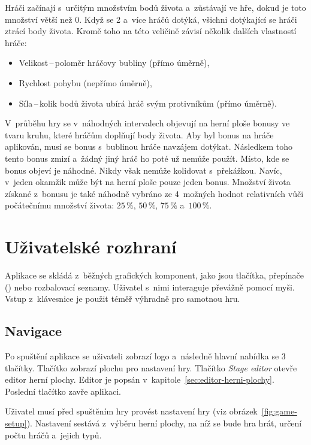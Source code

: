 Hráči začínají s~určitým množstvím bodů života a~zůstávají ve hře, dokud je toto množství větší než 0. Když se 2 a~více hráčů dotýká, všichni dotýkající se hráči ztrácí body života. Kromě toho na této veličině závisí několik dalších vlastností hráče:
\begin{itemize}
    \item Velikost\,--\,poloměr hráčovy bubliny (přímo úměrně),
    \item Rychlost pohybu (nepřímo úměrně),
    \item Síla\,--\,kolik bodů života ubírá hráč svým protivníkům (přímo úměrně).
\end{itemize}

V~průběhu hry se v~náhodných intervalech objevují na herní ploše bonusy ve tvaru kruhu, které hráčům doplňují body života. Aby byl bonus na hráče aplikován, musí se bonus s~bublinou hráče navzájem dotýkat. Následkem toho tento bonus zmizí a~žádný jiný hráč ho poté už nemůže použít. Místo, kde se bonus objeví je náhodné. Nikdy však nemůže kolidovat s~překážkou. Navíc, v~jeden okamžik může být na herní ploše pouze jeden bonus. Množství života získané z~bonusu je také náhodně vybráno ze 4~možných hodnot relativních vůči počátečnímu množství života: $25\,\%$, $50\,\%$, $75\,\%$ a~$100\,\%$.

\section{Uživatelské rozhraní}
\label{sec:uzivatelske-rozhrani}

Aplikace se skládá z~běžných grafických komponent, jako jsou tlačítka, přepínače () nebo rozbalovací seznamy. Uživatel s~nimi interaguje převážně pomocí myši. Vstup z~klávesnice je použit téměř výhradně pro samotnou hru.

\subsection*{Navigace}

Po spuštění aplikace se uživateli zobrazí logo a~následně hlavní nabídka se 3 tlačítky. Tlačítko  zobrazí plochu pro nastavení hry. Tlačítko \emph{Stage editor} otevře editor herní plochy. Editor je popsán v~kapitole~\ref{sec:editor-herni-plochy}. Poslední tlačítko  zavře aplikaci.

Uživatel musí před spuštěním hry provést nastavení hry (viz obrázek~\ref{fig:game-setup}). Nastavení sestává z~výběru herní plochy, na níž se bude hra hrát, určení počtu hráčů a~jejich typů.

